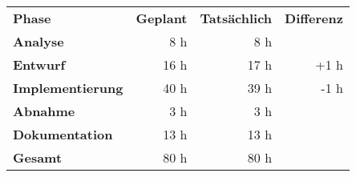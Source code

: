 \begin{tabular}{lrrr}
\rowcolor{heading}\textbf{Phase} & \textbf{Geplant} & \textbf{Tatsächlich} & \textbf{Differenz} \\
\textbf{Analyse} & 8 h  & 8 h  &  \\
\rowcolor{odd}\textbf{Entwurf} & 16 h   & 17 h  & +1 h \\
\textbf{Implementierung} & 40 h  & 39 h  & -1 h \\
\rowcolor{odd}\textbf{Abnahme} & 3 h   & 3 h   &  \\
\textbf{Dokumentation} & 13 h   & 13 h   &  \\
\hline
\hline
\rowcolor{odd}\textbf{Gesamt} & 80 h  & 80 h  &  \\
\end{tabular}
